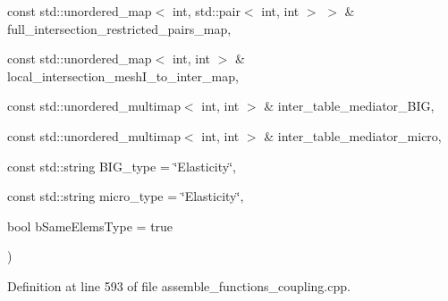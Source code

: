 {\begin{DoxyParamCaption}
\item[{const std\+::unordered\+\_\+map$<$ int, std\+::pair$<$ int, int $>$ $>$ \&}]{full\+\_\+intersection\+\_\+restricted\+\_\+pairs\+\_\+map, }
\item[{const std\+::unordered\+\_\+map$<$ int, int $>$ \&}]{local\+\_\+intersection\+\_\+mesh\+I\+\_\+to\+\_\+inter\+\_\+map, }
\item[{const std\+::unordered\+\_\+multimap$<$ int, int $>$ \&}]{inter\+\_\+table\+\_\+mediator\+\_\+\+B\+I\+G, }
\item[{const std\+::unordered\+\_\+multimap$<$ int, int $>$ \&}]{inter\+\_\+table\+\_\+mediator\+\_\+micro, }
\item[{const std\+::string}]{B\+I\+G\+\_\+type = {\ttfamily \char`\"{}Elasticity\char`\"{}}, }
\item[{const std\+::string}]{micro\+\_\+type = {\ttfamily \char`\"{}Elasticity\char`\"{}}, }
\item[{bool}]{b\+Same\+Elems\+Type = {\ttfamily true}}
\end{DoxyParamCaption}
)}\label{classcarl_1_1assemble__coupling__matrices_ae3a145dae0e2d3f49b49da8c6d382f97}


Definition at line 593 of file assemble\+\_\+functions\+\_\+coupling.\+cpp.



